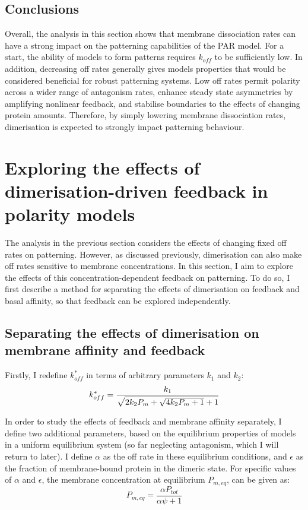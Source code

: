 \documentclass[12pt]{"report"}
\begin{document}
\subsection{Conclusions}

Overall, the analysis in this section shows that membrane dissociation rates can have a strong impact on the patterning capabilities of the PAR model. For a start, the ability of models to form patterns requires $k_{off}$ to be sufficiently low. In addition, decreasing off rates generally gives models properties that would be considered beneficial for robust patterning systems. Low off rates permit polarity across a wider range of antagonism rates, enhance steady state asymmetries by amplifying nonlinear feedback, and stabilise boundaries to the effects of changing protein amounts. Therefore, by simply lowering membrane dissociation rates, dimerisation is expected to strongly impact patterning behaviour. \\


\clearpage
\section{Exploring the effects of dimerisation-driven feedback in polarity models}

The analysis in the previous section considers the effects of changing fixed off rates on patterning. However, as discussed previously, dimerisation can also make off rates sensitive to membrane concentrations. In this section, I aim to explore the effects of this concentration-dependent feedback on patterning. To do so, I first describe a method for separating the effects of dimerisation on feedback and basal affinity, so that feedback can be explored independently. \\

\subsection{Separating the effects of dimerisation on membrane affinity and feedback}

Firstly, I redefine $k_{off}^*$ in terms of arbitrary parameters $k_1$ and $k_2$:
\begin{equation}
k_{off}^* = \frac{k_1}{\sqrt{2 k_2 P_m + \sqrt{4 k_2 P_m + 1} + 1}}\\
\end{equation}

In order to study the effects of feedback and membrane affinity separately, I define two additional parameters, based on the equilibrium properties of models in a uniform equilibrium system (so far neglecting antagonism, which I will return to later). I define $\alpha$ as the off rate in these equilibrium conditions, and $\epsilon$ as the fraction of membrane-bound protein in the dimeric state. For specific values of $\alpha$ and $\epsilon$, the membrane concentration at equilibrium $P_{m, eq}$, can be given as:
\begin{equation}
P_{m, eq} = \frac{\alpha P_{tot}}{\alpha \psi + 1}
\end{equation}
\end{document}
